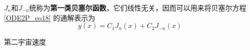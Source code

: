 $J_n$和$J_{-n}$统称为\textbf{第一类贝塞尔函数}，它们线性无关，因而可以用来将贝塞尔方程\autoref{ODE2P_eq18} 的通解表示为
\begin{equation}
y(x)=C_1J_n(x)+C_2J_{-n}(x)
\end{equation}


\begin{example}{第二宇宙速度}

\end{example}















